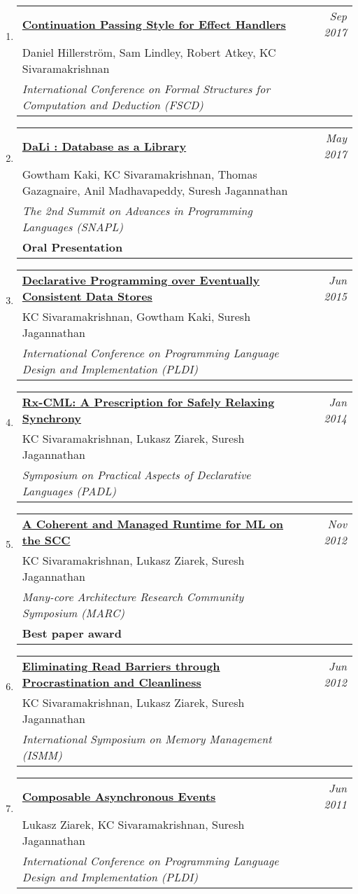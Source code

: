 \documentclass[10pt]{article}
\makeatletter
\newcommand{\lbar}[1]{{\color{#1}\ding{118}}\hspace*{2pt}}
\newenvironment{benumerate}[2]{
    \let\oldItem\item
    \def\item{\addtocounter{enumi}{-2}\oldItem}
    \begin{enumerate}[#2] \itemsep3pt
    \setcounter{enumi}{#1}
    \addtocounter{enumi}{1}}
  {\end{enumerate}}
\newenvironment{publication}[5]
{ \item
  \begin{tabular*}{7.5in}{p{6.3in}@{\extracolsep{\fill}}r}
    \href{#1}{\textbf{#2}} & \textit{#3}\\ #4 &\\ \textit{#5}&\\
  \end{tabular*}
} {}
\newenvironment{publicationNote}[6]
{ \item
  \begin{tabular*}{7.5in}{p{6.3in}@{\extracolsep{\fill}}r}
    \href{#1}{\textbf{#2}} & \textit{#3}\\ #4 &\\ \textit{#5}\\ \textbf{#6} \\
  \end{tabular*}
} {}
\newenvironment{region}[3]{%
  \vspace*{0.5ex}
  {\scalebox{1.4}{\textbf{#1}}}
  \begin{benumerate}{#3}{\color{RoyalBlue}#2}}
  {\end{benumerate}\vspace{0.8ex}}
\makeatother
\begin{document}
\begin{region} {\lbar{purple}Conference Publications}{{C}1}{15}
  \begin{publication} {http://kcsrk.info/papers/cps-handler-fscd17.pdf}
    {Continuation Passing Style for Effect Handlers}
    {Sep 2017} {Daniel Hillerström, Sam Lindley, Robert Atkey, KC Sivaramakrishnan}
    {International Conference on Formal Structures for Computation and Deduction (FSCD)}
  \end{publication}

  \begin{publicationNote} {http://kcsrk.info/papers/dali_snapl17.pdf}
    {DaLi : Database as a Library}
    {May 2017} {Gowtham Kaki, KC Sivaramakrishnan, Thomas Gazagnaire, Anil Madhavapeddy, Suresh Jagannathan}
    {The 2nd Summit on Advances in Programming Languages (SNAPL)}
    {Oral Presentation}
  \end{publicationNote}

  \begin{publication} {http://kcsrk.info/papers/quelea_pldi15.pdf}
    {Declarative Programming over Eventually Consistent Data Stores}
    {Jun 2015} {KC Sivaramakrishnan, Gowtham Kaki, Suresh Jagannathan}
    {International Conference on Programming Language Design and Implementation (PLDI)}
  \end{publication}

  \begin{publication}{http://kcsrk.info/papers/rxcml_padl14.pdf}
    {Rx-CML: A Prescription for Safely Relaxing Synchrony}
    {Jan 2014}{KC Sivaramakrishnan, Lukasz Ziarek, Suresh Jagannathan}
    {Symposium on Practical Aspects of Declarative Languages (PADL)}
  \end{publication}

  \begin{publicationNote}{http://kcsrk.info/papers/mmscc_marc12.pdf}
    {A Coherent and Managed Runtime for ML on the SCC}
    {Nov 2012}{KC Sivaramakrishnan, Lukasz Ziarek, Suresh Jagannathan}
    {Many-core Architecture Research Community Symposium (MARC)}
    {Best paper award}
  \end{publicationNote}

  \begin{publication}{http://kcsrk.info/papers/mmgc_ismm12.pdf}
    {Eliminating Read Barriers through Procrastination and Cleanliness}
    {Jun 2012}{KC Sivaramakrishnan, Lukasz Ziarek, Suresh Jagannathan}
    {International Symposium on Memory Management (ISMM)}
  \end{publication}

  \begin{publication}{http://kcsrk.info/papers/acml_pldi11.pdf}
    {Composable Asynchronous Events}
    {Jun 2011}{Lukasz Ziarek, KC Sivaramakrishnan, Suresh Jagannathan}
    {International Conference on Programming Language Design and Implementation (PLDI)}
  \end{publication}


\end{region}
\end{document}
